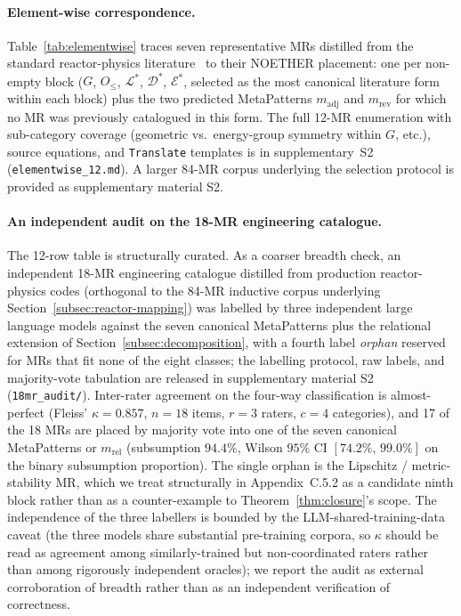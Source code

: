 \documentclass[acmsmall, screen]{acmart}
\begin{document}
\paragraph{Element-wise correspondence.} Table~\ref{tab:elementwise} traces seven representative MRs distilled from the standard reactor-physics literature~\cite{BellGlasstone1970, LewisMiller1993} to their NOETHER placement: one per non-empty block ($G$, $O_{\le}$, $\mathcal{L}^{*}$, $\mathcal{D}^{*}$, $\mathcal{E}^{*}$, selected as the most canonical literature form within each block) plus the two predicted MetaPatterns $m_{\mathrm{adj}}$ and $m_{\mathrm{rev}}$ for which no MR was previously catalogued in this form. The full 12-MR enumeration with sub-category coverage (geometric vs.\ energy-group symmetry within $G$, etc.), source equations, and \texttt{Translate} templates is in supplementary~S2 (\texttt{elementwise\_12.md}). A larger 84-MR corpus underlying the selection protocol is provided as supplementary material S2.

\paragraph{An independent audit on the 18-MR engineering catalogue.} The 12-row table is structurally curated. As a coarser breadth check, an independent 18-MR engineering catalogue distilled from production reactor-physics codes (orthogonal to the 84-MR inductive corpus underlying Section~\ref{subsec:reactor-mapping}) was labelled by three independent large language models against the seven canonical MetaPatterns plus the relational extension of Section~\ref{subsec:decomposition}, with a fourth label \emph{orphan} reserved for MRs that fit none of the eight classes; the labelling protocol, raw labels, and majority-vote tabulation are released in supplementary material S2 (\texttt{18mr\_audit/}). Inter-rater agreement on the four-way classification is almost-perfect (Fleiss' $\kappa = 0.857$, $n=18$ items, $r=3$ raters, $c=4$ categories), and 17 of the 18 MRs are placed by majority vote into one of the seven canonical MetaPatterns or $m_{\mathrm{rel}}$ (subsumption $94.4\%$, Wilson $95\%$ CI $[74.2\%,\, 99.0\%]$ on the binary subsumption proportion). The single orphan is the Lipschitz / metric-stability MR, which we treat structurally in Appendix~C.5.2 as a candidate ninth block rather than as a counter-example to Theorem~\ref{thm:closure}'s scope. The independence of the three labellers is bounded by the LLM-shared-training-data caveat (the three models share substantial pre-training corpora, so $\kappa$ should be read as agreement among similarly-trained but non-coordinated raters rather than among rigorously independent oracles); we report the audit as external corroboration of breadth rather than as an independent verification of correctness.
\end{document}
